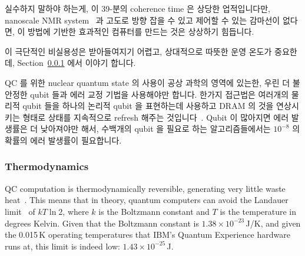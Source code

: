 실수하지 말하야 하는게, 이 39-분의 coherence time 은 상당한 업적입니다만,
nanoscale NMR system~\cite{HJMamin2013QC-nanoscale-NMR} 과 고도로 방향 잡을 수
있고 제어할 수 있는 감마선이 없다면, 이 방법에 기반한 효과적인 컴퓨터를 만드는
것은 상상하기 힘듭니다.

이 극단적인 비실용성은 받아들여지기 어렵고, 상대적으로 따뜻한 운영 온도가
중요한데,
Section~\ref{sec:future:Thermodynamics} 에서 이야기 합니다.

QC 를 위한 nuclear quantum state 의 사용이 공상 과학의 영역에 있는한, 우린 더
불안정한 qubit 들과 에러 교정 기법을 사용해야만 합니다.
한가지 접근법은 여러개의 물리적 qubit 들을 하나의 논리적 qubit 을 표현하는데
사용하고 DRAM 의 것을 연상시키는 형태로 상태를 지속적으로 refresh 해주는
것입니다~\cite{DanielThomasSankPhD}.
Qubit 이 많아지면 에러 발생률은 더 낮아져야만 해서, 수백개의 qubit 을 필요로
하는 알고리즘들에서는 $10^{-8}$ 의 확률의 에러 발생률이 필요합니다.

\subsubsection{Thermodynamics}
\label{sec:future:Thermodynamics}

QC computation is thermodynamically reversible, generating
very little waste heat~\cite{Bennett:1973:LRC:1664562.1664568,RichardFeynman1986QuantumMechanicalComputers}.
This means that in theory, quantum computers can avoid the
Landauer limit~\cite{Landauer:1961:IHG:1661184.1661186}
of $kT \ln 2$, where $k$ is the Boltzmann constant and $T$ is the
temperature in degrees Kelvin.
Given that the Boltzmann constant is $1.38 \times 10^{-23}$\,J/K,
and given the 0.015\,K operating temperatures that IBM's Quantum Experience
hardware runs at, this limit is indeed low: $1.43 \times 10^{-25}$\,J.

